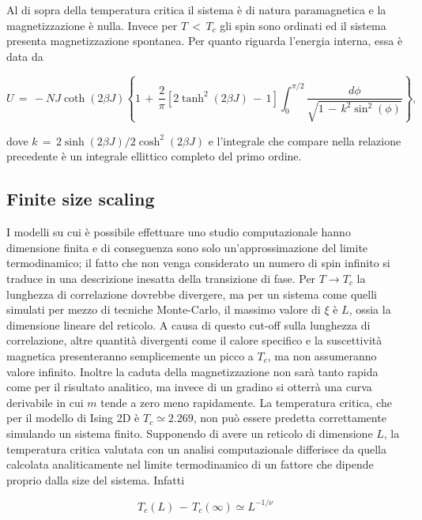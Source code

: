 Al di sopra della temperatura critica il sistema è di natura paramagnetica e la magnetizzazione è nulla. Invece per $T\,<\,T_c$ gli 
spin sono ordinati ed il sistema presenta magnetizzazione spontanea. Per quanto riguarda l'energia interna, essa 
è data da \cite{Patria}

\begin{equation}
    U\,=\,-NJ\coth{\left(2\beta J\right)}\left\{1\,+\,\frac{2}{\pi}\left[2\tanh^2\left(2\beta J\right)\,-\,1\right]\int_0^{\pi/2}\frac{d\phi}{\sqrt{1\,-\,k^2\sin^2{\left(\phi\right)}}}\right\},
    \label{eq: ene_Onsager_1944}
\end{equation}

dove $k\,=\,2\sinh{\left(2\beta J\right)}/2\cosh^2{\left(2\beta J\right)}$ e l'integrale che compare nella relazione 
precedente è un integrale ellittico completo del primo ordine.



\subsection{Finite size scaling}

I modelli su cui è possibile effettuare uno studio computazionale hanno dimensione finita e di conseguenza sono solo un'approssimazione 
del limite termodinamico; il fatto che non venga considerato un numero di spin infinito si traduce in una descrizione inesatta della 
transizione di fase. Per $T \to T_c$ la lunghezza di correlazione dovrebbe divergere, ma per un sistema come quelli simulati per mezzo di 
tecniche Monte-Carlo, il massimo valore di $\xi$ è $L$, ossia la dimensione lineare del reticolo. A causa di questo cut-off sulla 
lunghezza di correlazione, altre quantità divergenti come il calore specifico e la suscettività magnetica presenteranno semplicemente un 
picco a $T_c$, ma non assumeranno valore infinito. Inoltre la caduta della magnetizzazione non sarà tanto rapida come per il risultato 
analitico, ma invece di un gradino si otterrà una curva derivabile in cui $m$ tende a zero meno rapidamente. La temperatura critica, 
che per il modello di Ising 2D è $T_c \simeq 2.269$, non può essere predetta correttamente simulando un sistema finito. Supponendo di 
avere un reticolo di dimensione $L$, la temperatura critica valutata con un analisi computazionale differisce da quella calcolata 
analiticamente nel limite termodinamico di un fattore che dipende proprio dalla size del sistema. Infatti 

\begin{equation}
	T_c\left(L\right)\,-\,T_c\left(\infty\right) \simeq L^{-1/\nu}
	\label{eq: fs_Tc}
\end{equation}

